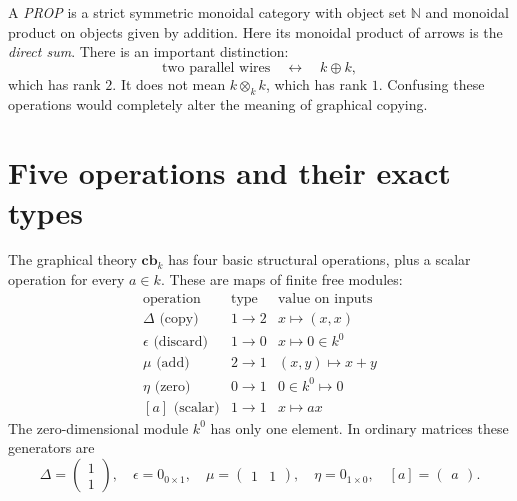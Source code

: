 A \emph{PROP} is a strict symmetric monoidal category with object set \(\mathbb N\) and monoidal product on objects given by addition. Here its monoidal product of arrows is the \emph{direct sum}. There is an important distinction:
\[
 \text{two parallel wires}\quad\longleftrightarrow\quad k\oplus k,
\]
which has rank \(2\). It does not mean \(k\otimes_k k\), which has rank \(1\). Confusing these operations would completely alter the meaning of graphical copying.

\section{Five operations and their exact types}

The graphical theory \(\mathbf{cb}_k\) has four basic structural operations, plus a scalar operation for every \(a\in k\). These are maps of finite free modules:
\[
\begin{array}{c|c|c}
\text{operation}&\text{type}&\text{value on inputs}\\ \hline
\Delta\text{ (copy)}&1\to2&x\mapsto(x,x)\\
\epsilon\text{ (discard)}&1\to0&x\mapsto 0\in k^0\\
\mu\text{ (add)}&2\to1&(x,y)\mapsto x+y\\
\eta\text{ (zero)}&0\to1&0\in k^0\mapsto0\\
{}[a]\text{ (scalar)}&1\to1&x\mapsto ax
\end{array}
\]
The zero-dimensional module \(k^0\) has only one element. In ordinary matrices these generators are
\[
 \Delta=\begin{pmatrix}1\\1\end{pmatrix},\quad
 \epsilon=0_{0\times1},\quad
 \mu=\begin{pmatrix}1&1\end{pmatrix},\quad
 \eta=0_{1\times0},\quad
 [a]=\begin{pmatrix}a\end{pmatrix}.
\]

